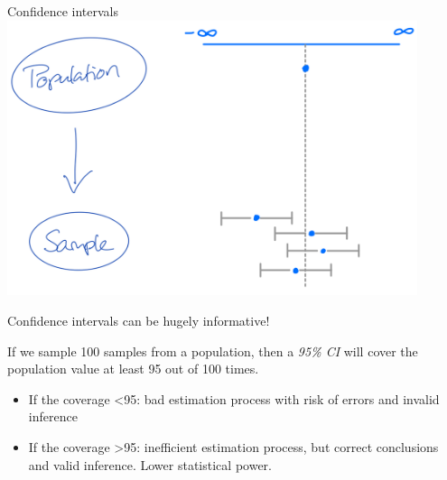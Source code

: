 \documentclass[
  ignorenonframetext,
]{beamer}
\providecommand{\tightlist}{%
  \setlength{\itemsep}{0pt}\setlength{\parskip}{0pt}}\usepackage{longtable,booktabs,array}
\begin{document}
\begin{frame}{Confidence intervals}
\protect\hypertarget{confidence-intervals}{}
\includegraphics[width=0.9\textwidth,height=\textheight]{img/7. confidence_intervals.png}

Confidence intervals can be hugely informative!

If we sample 100 samples from a population, then a \emph{95\% CI} will
cover the population value at least 95 out of 100 times.

\begin{itemize}
\tightlist
\item
  If the coverage \textless95: bad estimation process with risk of
  errors and invalid inference
\item
  If the coverage \textgreater95: inefficient estimation process, but
  correct conclusions and valid inference. Lower statistical power.
\end{itemize}
\end{frame}
\end{document}
